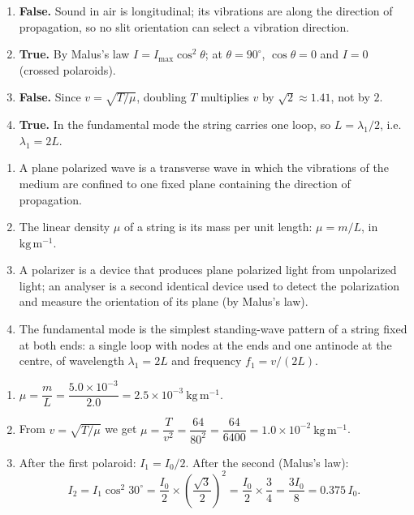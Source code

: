 \documentclass[11pt]{article}
\newcommand{\cle}[1]{{\popxbold\color{popdark}#1}}
\begin{document}
\begin{corrige}
\begin{enumerate}
\item \textbf{False.} Sound in air is longitudinal; its vibrations are along the direction of propagation, so no slit orientation can select a vibration direction.
\item \textbf{True.} By Malus's law $I=I_{\max}\cos^2\theta$; at $\theta=90^{\circ}$, $\cos\theta=0$ and $I=0$ (crossed polaroids).
\item \textbf{False.} Since $v=\sqrt{T/\mu}$, doubling $T$ multiplies $v$ by $\sqrt{2}\approx 1.41$, not by $2$.
\item \textbf{True.} In the fundamental mode the string carries one loop, so $L=\lambda_1/2$, i.e. $\lambda_1=2L$.
\end{enumerate}
\end{corrige}

\begin{corrige}
\begin{enumerate}
\item A \cle{plane polarized wave} is a transverse wave in which the vibrations of the medium are confined to one fixed plane containing the direction of propagation.
\item The \cle{linear density} $\mu$ of a string is its mass per unit length: $\mu=m/L$, in $\mathrm{kg\,m^{-1}}$.
\item A \cle{polarizer} is a device that produces plane polarized light from unpolarized light; an \cle{analyser} is a second identical device used to detect the polarization and measure the orientation of its plane (by Malus's law).
\item The \cle{fundamental mode} is the simplest standing-wave pattern of a string fixed at both ends: a single loop with nodes at the ends and one antinode at the centre, of wavelength $\lambda_1=2L$ and frequency $f_1=v/(2L)$.
\end{enumerate}
\end{corrige}

\begin{corrige}
\begin{enumerate}
\item $\mu=\dfrac{m}{L}=\dfrac{5.0\times10^{-3}}{2.0}=2.5\times10^{-3}\ \mathrm{kg\,m^{-1}}$.
\item From $v=\sqrt{T/\mu}$ we get $\mu=\dfrac{T}{v^2}=\dfrac{64}{80^2}=\dfrac{64}{6400}=1.0\times10^{-2}\ \mathrm{kg\,m^{-1}}$.
\item After the first polaroid: $I_1=I_0/2$. After the second (Malus's law):
\[I_2=I_1\cos^2 30^{\circ}=\frac{I_0}{2}\times\left(\frac{\sqrt{3}}{2}\right)^2=\frac{I_0}{2}\times\frac{3}{4}=\frac{3I_0}{8}=0.375\,I_0.\]
\end{enumerate}
\end{corrige}
\end{document}
